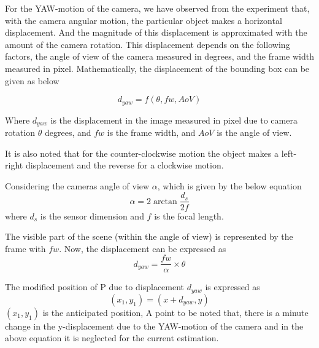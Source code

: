 


For the YAW-motion of the camera, we have observed from the experiment that, with the camera angular motion, the particular object makes a horizontal displacement. And the magnitude of this displacement is approximated with the amount of the camera rotation. This displacement depends on the following factors, the angle of view of the camera measured in degrees, and the frame width measured in pixel. Mathematically, the displacement of the bounding box can be given as below

\begin{equation} \label{yaw-displacement}
{d_{yaw}} = f({\theta , fw, AoV})
\end{equation}

Where ${d_{yaw}}$ is the displacement in the image measured in pixel due to camera rotation ${\theta}$ degrees, and $fw$ is the frame width, and $AoV$ is the angle of view.

It is also noted that for the counter-clockwise motion the object makes a left-right displacement and the reverse for a clockwise motion. 

Considering the cameras angle of view $\alpha$, which is given by the below equation
\begin{equation} \label{angle-of-view}
\alpha =2\arctan {\frac {d_s}{2f}}
\end{equation}
where ${d_s}$ is the sensor dimension and $f$ is the focal length.

The visible part of the scene (within the angle of view) is represented by the frame with $fw$. Now, the displacement can be expressed as
\begin{equation} \label{yaw-displacement-detail}
{d_{yaw}} = \frac {fw}{\alpha} \times {\theta}
\end{equation}

The modified position of P due to displacement ${d_{yaw}}$ is expressed as
\begin{equation} \label{new-xy}
(x_1, y_1) = (x + d_{yaw}, y)
\end{equation}
$(x_1, y_1)$ is the anticipated position, A point to be noted that, there is a minute change in the y-displacement due to the YAW-motion of the camera and in the above equation it is neglected for the current estimation.


